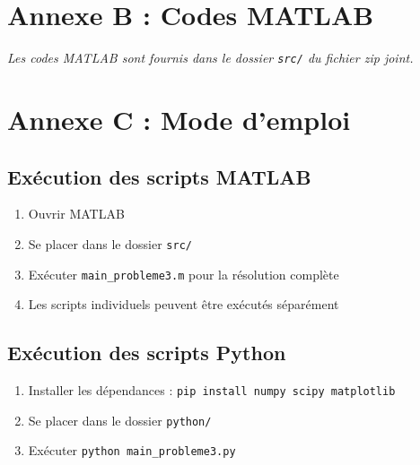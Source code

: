 \documentclass[12pt, a4paper, french]{article}
\begin{document}
\section{Annexe B : Codes MATLAB}

\textit{Les codes MATLAB sont fournis dans le dossier \texttt{src/} du fichier zip joint.}

\section{Annexe C : Mode d'emploi}

\subsection{Exécution des scripts MATLAB}
\begin{enumerate}
    \item Ouvrir MATLAB
    \item Se placer dans le dossier \texttt{src/}
    \item Exécuter \texttt{main\_probleme3.m} pour la résolution complète
    \item Les scripts individuels peuvent être exécutés séparément
\end{enumerate}

\subsection{Exécution des scripts Python}
\begin{enumerate}
    \item Installer les dépendances : \texttt{pip install numpy scipy matplotlib}
    \item Se placer dans le dossier \texttt{python/}
    \item Exécuter \texttt{python main\_probleme3.py}
\end{enumerate}
\end{document}
